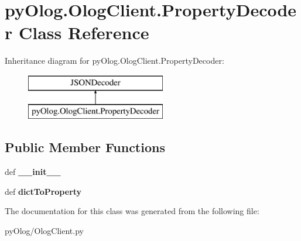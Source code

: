 \hypertarget{classpyOlog_1_1OlogClient_1_1PropertyDecoder}{\section{py\-Olog.\-Olog\-Client.\-Property\-Decoder Class Reference}
\label{classpyOlog_1_1OlogClient_1_1PropertyDecoder}
}
Inheritance diagram for py\-Olog.\-Olog\-Client.\-Property\-Decoder\-:\begin{figure}[H]
\begin{center}
\leavevmode
\includegraphics[height=2.000000cm]{classpyOlog_1_1OlogClient_1_1PropertyDecoder}
\end{center}
\end{figure}
\subsection*{Public Member Functions}
\begin{DoxyCompactItemize}
\item 
\hypertarget{classpyOlog_1_1OlogClient_1_1PropertyDecoder_a02e76c4a9b7e9fecf6f8b9a68a0ee379}{def {\bfseries \-\_\-\-\_\-init\-\_\-\-\_\-}}\label{classpyOlog_1_1OlogClient_1_1PropertyDecoder_a02e76c4a9b7e9fecf6f8b9a68a0ee379}

\item 
\hypertarget{classpyOlog_1_1OlogClient_1_1PropertyDecoder_ab3803ba06262664e3c55d48421be68c8}{def {\bfseries dict\-To\-Property}}\label{classpyOlog_1_1OlogClient_1_1PropertyDecoder_ab3803ba06262664e3c55d48421be68c8}

\end{DoxyCompactItemize}


The documentation for this class was generated from the following file\-:\begin{DoxyCompactItemize}
\item 
py\-Olog/Olog\-Client.\-py\end{DoxyCompactItemize}
